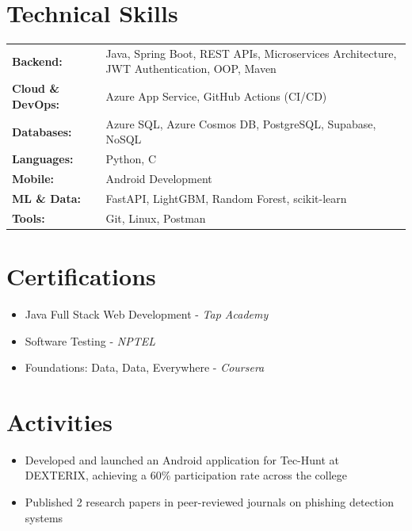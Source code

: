 \documentclass[10pt, a4paper]{article}
\begin{document}
\section{Technical Skills}

\begin{tabular}{@{}ll}
\textbf{Backend:}        & Java, Spring Boot, REST APIs, Microservices Architecture, JWT Authentication, OOP, Maven \\[2pt]
\textbf{Cloud \& DevOps:} & Azure App Service, GitHub Actions (CI/CD) \\[2pt]
\textbf{Databases:}      & Azure SQL, Azure Cosmos DB, PostgreSQL, Supabase, NoSQL \\[2pt]
\textbf{Languages:}      & Python, C \\[2pt]
\textbf{Mobile:}         & Android Development \\[2pt]
\textbf{ML \& Data:}     & FastAPI, LightGBM, Random Forest, scikit-learn \\[2pt]
\textbf{Tools:}          & Git, Linux, Postman \\
\end{tabular}

\section{Certifications}

\begin{itemize}
    \item Java Full Stack Web Development - \textit{Tap Academy}
    \item Software Testing - \textit{NPTEL}
    \item Foundations: Data, Data, Everywhere - \textit{Coursera}
\end{itemize}

\section{Activities}

\begin{itemize}
    \item Developed and launched an Android application for Tec-Hunt at DEXTERIX, achieving a 60\% participation rate across the college
    \item Published 2 research papers in peer-reviewed journals on phishing detection systems
\end{itemize}
\end{document}
